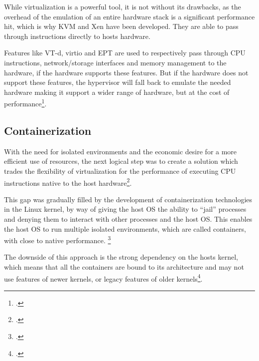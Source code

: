 While virtualization is a powerful tool, it is not without its drawbacks, as the overhead of the emulation of an entire hardware stack is a significant performance hit,
which is why \ac{KVM} and Xen have been developed. They are able to pass through instructions directly to \gls{host}s hardware.

Features like \gls{VT-d}, \gls{virtio} and \gls{EPT} are used to respectively pass through \ac{CPU} instructions, network/storage interfaces and memory management to the hardware,
if the hardware supports these features.
But if the hardware does not support these features, the hypervisor will fall back to emulate the needed hardware making it support a wider range of hardware,
but at the cost of performance\footcite{barhamXenArtVirtualization2003}.


\subsection{Containerization}
\label{sec:containerization}

With the need for isolated environments and the economic desire for a more efficient use of resources,
the next logical step was to create a solution which trades the flexibility of virtualization for the
performance of executing \ac{CPU} instructions native to the \gls{host} hardware\footcite{ercegAnotherBriefHistory2022}.

This gap was gradually filled by the development of containerization technologies in the Linux kernel,
by way of giving the \gls{host} \ac{OS} the ability to “jail” processes and denying them to interact with other processes and the \gls{host} \ac{OS}.
This enables the \gls{host} \ac{OS} to run multiple isolated environments, which are called containers,
with close to native performance. \footcite{randalIdealRealRevisiting2021}

The downside of this approach is the strong dependency on the \gls{host}s kernel,
which means that all the containers are bound to its architecture and may not use features of newer kernels,
or legacy features of older kernels\footcite{kovacsComparisonDifferentLinux2017}.

